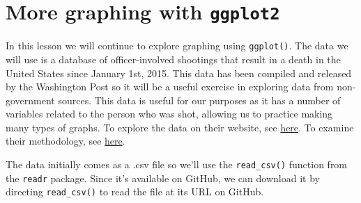 \documentclass[
  12pt,
]{book}
\begin{document}
\hypertarget{ois_graphs}{%
\chapter{\texorpdfstring{More graphing with \texttt{ggplot2}}{More graphing with ggplot2}}\label{ois_graphs}}

In this lesson we will continue to explore graphing using \texttt{ggplot()}. The data we will use is a database of officer-involved shootings that result in a death in the United States since January 1st, 2015. This data has been compiled and released by the Washington Post so it will be a useful exercise in exploring data from non-government sources. This data is useful for our purposes as it has a number of variables related to the person who was shot, allowing us to practice making many types of graphs.
To explore the data on their website, see \href{https://www.washingtonpost.com/graphics/2019/national/police-shootings-2019/?utm_term=.e870afc9a00c}{here}.
To examine their methodology, see \href{https://www.washingtonpost.com/national/how-the-washington-post-is-examining-police-shootings-in-the-united-states/2016/07/07/d9c52238-43ad-11e6-8856-f26de2537a9d_story.html?utm_term=.f07e9800092b}{here}.

The data initially comes as a .csv file so we'll use the \texttt{read\_csv()} function from the \texttt{readr} package. Since it's available on GitHub, we can download it by directing \texttt{read\_csv()} to read the file at its URL on GitHub.
\end{document}
